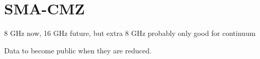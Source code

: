\section{SMA-CMZ}
8 GHz now, 16 GHz future, but extra 8 GHz probably only good for continuum

Data to become public when they are reduced.

